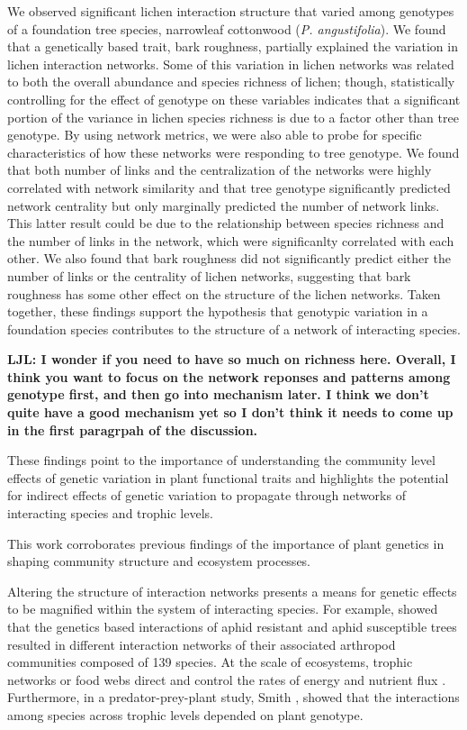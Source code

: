 \documentclass[9pt,twocolumn,twoside,lineno]{pnas-new}
\begin{document}
We observed significant lichen interaction structure that varied among
genotypes of a foundation tree species, narrowleaf cottonwood
(\textit{P. angustifolia}). We found that a genetically based trait,
bark roughness, partially explained the variation in lichen
interaction networks. Some of this variation in lichen networks was
related to both the overall abundance and species richness of lichen;
though, statistically controlling for the effect of genotype on these
variables indicates that a significant portion of the variance in
lichen species richness is due to a factor other than tree
genotype. By using network metrics, we were also able to probe for
specific characteristics of how these networks were responding to tree
genotype. We found that both number of links and the centralization of
the networks were highly correlated with network similarity and that
tree genotype significantly predicted network centrality but only
marginally predicted the number of network links. This latter result
could be due to the relationship between species richness and the
number of links in the network, which were significanlty correlated
with each other. We also found that bark roughness did not
significantly predict either the number of links or the centrality of
lichen networks, suggesting that bark roughness has some other effect
on the structure of the lichen networks. Taken together, these
findings support the hypothesis that genotypic variation in a
foundation species contributes to the structure of a network of
interacting species.

\textbf{LJL: I wonder if you need to have so much on richness here. 
Overall, I think you want to focus on the network reponses and
patterns among genotype first, and then go into mechanism later. I
think we don’t quite have a good mechanism yet so I don’t think it
needs to come up in the first paragrpah of the discussion.}



These findings point to the importance of understanding the community
level effects of genetic variation in plant functional traits and
highlights the potential for indirect effects of genetic variation to
propagate through networks of interacting species and trophic levels.

This work corroborates previous findings of the importance of plant
genetics in shaping community structure and ecosystem
processes. \citep{Bangert2008}


Altering the structure of interaction networks
presents a means for genetic effects to be magnified within the system
of interacting species. For example, \citep{Keith2017} showed that the
genetics based interactions of aphid resistant and aphid susceptible
trees resulted in different interaction networks of their associated
arthropod communities composed of 139 species. At the scale of
ecosystems, trophic networks or food webs direct and control the rates
of energy and nutrient flux \cite{Borgatti2006}. Furthermore, in a
predator-prey-plant study, Smith \cite{Smith2011}, showed that the
interactions among species across trophic levels depended on plant
genotype.
\end{document}
